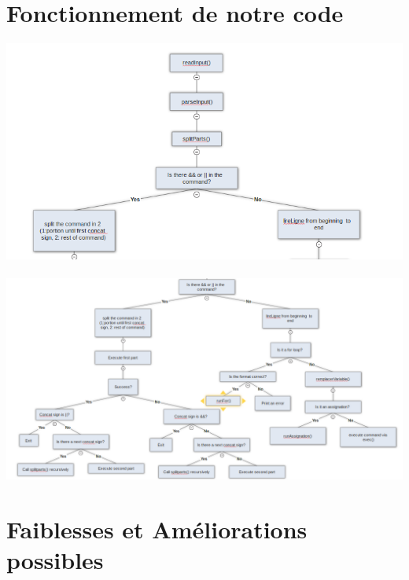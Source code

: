\documentclass{article}
\begin{document}
\section{Fonctionnement de notre code}
\includegraphics[width=\textwidth,height=\textheight,keepaspectratio]{codepartie1}
\\
\\
\includegraphics[width=\textwidth,height=\textheight,keepaspectratio]{codepartie2}


\section{Faiblesses et Améliorations possibles}
\end{document}
